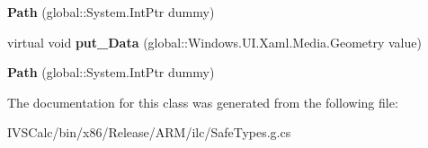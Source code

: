 \begin{DoxyCompactItemize}
\mbox{\label{class_windows_1_1_u_i_1_1_xaml_1_1_shapes_1_1_path_ab5b4d73c18e3c00758722458e89b0dfb}} 
{\bfseries Path} (global\+::\+System.\+Int\+Ptr dummy)
\item 
\mbox{\label{class_windows_1_1_u_i_1_1_xaml_1_1_shapes_1_1_path_aa6e757e6f0613691174ca7830b9e8db3}} 
virtual void {\bfseries put\+\_\+\+Data} (global\+::\+Windows.\+U\+I.\+Xaml.\+Media.\+Geometry value)
\item 
\mbox{\label{class_windows_1_1_u_i_1_1_xaml_1_1_shapes_1_1_path_ab5b4d73c18e3c00758722458e89b0dfb}} 
{\bfseries Path} (global\+::\+System.\+Int\+Ptr dummy)
\end{DoxyCompactItemize}


The documentation for this class was generated from the following file\+:\begin{DoxyCompactItemize}
\item 
I\+V\+S\+Calc/bin/x86/\+Release/\+A\+R\+M/ilc/Safe\+Types.\+g.\+cs\end{DoxyCompactItemize}
